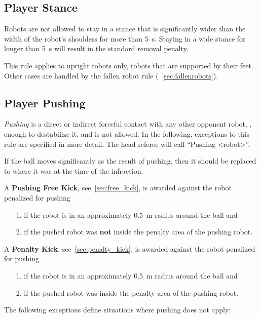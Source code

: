 \subsection{Player Stance}
\label{sec:player_stance}

Robots are not allowed to stay in a stance that is significantly wider than the width of the robot's shoulders for more than \qty{5}{\second}.
Staying in a wide stance for longer than \qty{5}{\second} will result in the standard removal penalty.

This rule applies to upright robots only, \ie robots that are supported by their feet.
Other cases are handled by the fallen robot rule (\cf~\cref{sec:fallenrobots}).

\subsection{Player Pushing}
\label{sec:player_pushing}

\emph{Pushing} is a direct or indirect forceful contact with any other opponent robot, \ie, enough to destabilize it, and is not allowed. In the following, exceptions to this rule are specified in more detail.
The head referee will call ``Pushing \textless robot\textgreater''.

If the ball moves significantly as the result of pushing, then it should be replaced to where it was at the time of the infraction.

A \textbf{Pushing Free Kick}, see~\cref{sec:free_kick}, is awarded against the robot penalized for pushing
\begin{itemize}
  \item[1.] if the robot is in an approximately \qty{0.5}{\metre} radius around the ball and
  \item[2.] if the pushed robot was \textbf{not} inside the penalty area of the pushing robot.
\end{itemize}

A \textbf{Penalty Kick}, see~\cref{sec:penalty_kick}, is awarded against the robot penalized for pushing
\begin{itemize}
  \item[1.] if the robot is in an approximately \qty{0.5}{\metre} radius around the ball and
  \item[2.] if the pushed robot was inside the penalty area of the pushing robot.
\end{itemize}

The following exceptions define situations where pushing does not apply:

